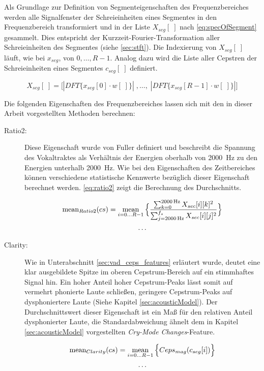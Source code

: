 Als Grundlage zur Definition von Segmenteigenschaften des Frequenzbereiches werden alle Signalfenster der Schreieinheiten eines Segmentes in den Frequenzbereich transformiert und in der Liste $X_{seg}[\;]$ nach \ref{eq:specOfSegment} gesammelt. Dies entspricht der Kurzzeit-Fourier-Transformation aller Schreieinheiten des Segmentes (siehe \autoref{sec:stft}). Die Indexierung von $X_{seg}[\;]$ läuft, wie bei $x_{seg}$, von $0 , \ldots , R-1$. Analog dazu wird die Liste aller Cepstren der Schreieinheiten eines Segmentes $c_{seg}[\;]$ definiert. 

\begin{equation}
X_{seg}[\; ] = \Big[ |DFT\{x_{seg}[0] \cdot w[\;]\}| \; , \ldots , \; |DFT\{x_{seg}[R-1] \cdot w[\;]\}| \Big]
\label{eq:specOfSegment}
\end{equation}


Die folgenden Eigenschaften des Frequenzbereiches lassen sich mit den in dieser Arbeit vorgestellten Methoden berechnen:

\begin{description}
\item[Ratio2:] Diese Eigenschaft wurde von Fuller \cite{threeCryTypes} definiert und beschreibt die Spannung des Vokaltraktes als Verhältnis der Energien oberhalb von \SI{2000}{\hertz} zu den Energien unterhalb \SI{2000}{\hertz}. Wie bei den Eigenschaften des Zeitbereiches können verschiedene statistische Kennwerte bezüglich dieser Eigenschaft berechnet werden. \autoref{eq:ratio2} zeigt die Berechnung des Durchschnitts.

\begin{equation}
\begin{gathered}
\text{mean}_{Ratio2}(cs) = \operatorname*{mean}_{i=0\ldots R-1} \Big\{ \frac{\sum_{k=0}^{\SI{2000}{\hertz}} X_{sec}[i][k]^2}{\sum_{j=\SI{2000}{\hertz}}^{f_{s}} X_{sec}[i][j]^2} \Big\} \\
\ldots
\end{gathered}
\label{eq:ratio2}
\end{equation}


\item[Clarity: ] Wie in Unterabschnitt \ref{sec:vad_ceps_features} erläutert wurde, deutet eine klar ausgebildete Spitze im oberen Cepstrum-Bereich auf ein stimmhaftes Signal hin. Ein hoher Anteil hoher Cepstrum-Peaks lässt somit auf vermehrt phonierte Laute schließen, geringere Cepstrum-Peaks auf dysphoniertere Laute (Siehe Kapitel \ref{sec:acousticModel}). Der Durchschnittswert dieser Eigenschaft ist ein Maß für den relativen Anteil dysphonierter Laute, die Standardabweichung ähnelt dem in Kapitel \ref{sec:acousticModel} vorgestellten \emph{Cry-Mode Changes}-Feature.

\begin{equation}
\begin{gathered}
\text{mean}_{Clarity}(cs) = \operatorname*{mean}_{i=0\ldots R-1} \Big\{ Ceps_{mag}(c_{seg}[i])  \Big\} \\
\ldots
\end{gathered}
\end{equation}
	
	
\end{description}


